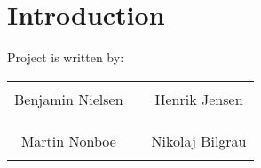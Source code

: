 \chapter*{Introduction}


Project is written by:\\
%
\phantom{Luft}\vspace{3cm}
\begin{table}[H]
	\centering
		\begin{tabular}{c c c}
			\underline{\phantom{JAERJAERJAERJAERGO}} & \phantom{cookies} & \underline{\phantom{JAERJAERJAERJAERGO}} \\
			Benjamin Nielsen			& \phantom{cookies} & Henrik Jensen		\\
			&&\\
			&&\\
			\underline{\phantom{JAERJAERJAERJAERGO}} & \phantom{cookies} & \underline{\phantom{JAERJAERJAERJAERGO}} \\
			Martin Nonboe			& \phantom{cookies} & Nikolaj Bilgrau		\\
			&&\\
						
		\end{tabular}
\end{table}